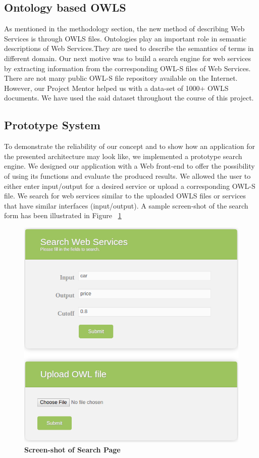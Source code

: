 \documentclass[12pt, twoside]{book}
\begin{document}
\subsection{Ontology based OWLS}
As mentioned in the methodology section, the new method of describing Web Services is through OWLS files. Ontologies play an important role in semantic descriptions of Web Services.They are used to describe the semantics of terms in different domain. Our next motive was to build a search engine for web services by extracting information from the corresponding OWL-S files of Web Services. There are not many public OWL-S file repository available on the Internet. However, our Project Mentor helped us with a data-set of 1000+ OWLS documents. We have used the said dataset throughout the course of this project.\\

\subsection{Prototype System}
To demonstrate the reliability of our concept and to show how an application for the presented architecture may look like, we implemented a prototype search engine. We designed our application with a Web front-end to offer the possibility of using its functions and evaluate the produced results. We allowed the user to either enter input/output for a desired service or upload a corresponding OWL-S file. We search for web services similar to the uploaded OWLS files or services that have similar interfaces (input/output). A sample screen-shot of the search form has been illustrated in Figure ~\ref{fig: search} \\ \par
\begin{figure}[h]
 \centering
 \includegraphics[width=\textwidth]{pics/search.png}
 \caption{\textbf{Screen-shot of Search Page}}
 \label{fig: search}
\end{figure}
\end{document}
